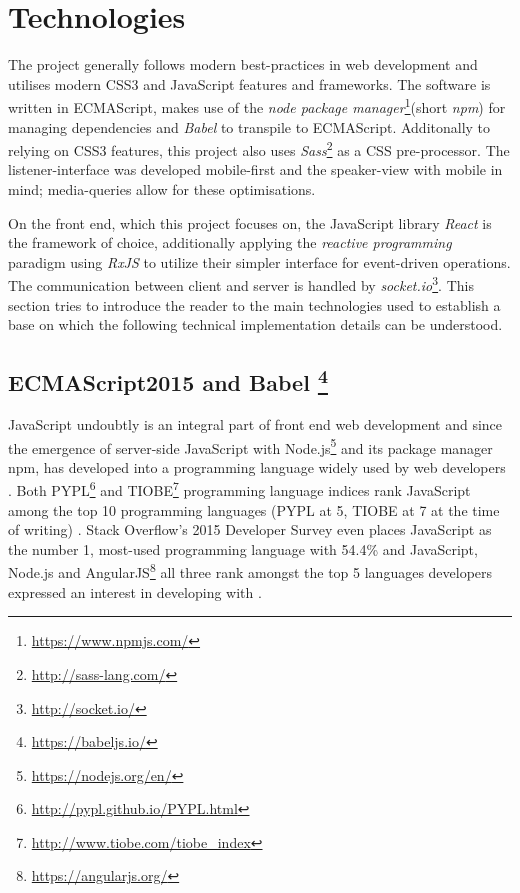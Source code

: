 \section{Technologies}
\label{sec:implementation-technologies}

The project generally follows modern best-practices in web development and utilises modern CSS3 and JavaScript features and frameworks. The software is written in ECMA\-Script, makes use of the \emph{node package manager}\footnote{\url{https://www.npmjs.com/}}(short \emph{npm}) for managing dependencies and \emph{Babel} to transpile to ECMA\-Script. Additonally to relying on CSS3 features, this project also uses \emph{Sass}\footnote{\url{http://sass-lang.com/}} as a CSS pre-processor. The listener-interface was developed mobile-first and the speaker-view with mobile in mind; media-queries allow for these optimisations.

On the front end, which this project focuses on, the JavaScript library \emph{React} is the framework of choice, additionally applying the \emph{reactive programming} paradigm using \emph{RxJS} to utilize their simpler interface for event-driven operations. The communication between client and server is handled by \emph{socket.io}\footnote{\url{http://socket.io/}}.
This section tries to introduce the reader to the main technologies used to establish a base on which the following technical implementation details can be understood.

\subsection[ECMAScript2015 and Babel]%
             {ECMAScript2015 and Babel%
             \protect\footnote{\url{https://babeljs.io/}}}%
\label{sec:implementation-technologies-es6}
JavaScript undoubtly is an integral part of front end web development and since the emergence of server-side JavaScript with Node.js\footnote{\url{https://nodejs.org/en/}} and its package manager npm, has developed into a programming language widely used by web developers \cite{gpm-meta-transcompiler}. Both PYPL\footnote{\url{http://pypl.github.io/PYPL.html}} and TIOBE\footnote{\url{http://www.tiobe.com/tiobe_index}} programming language indices rank JavaScript among the top 10 programming languages (PYPL at 5, TIOBE at 7 at the time of writing) \cite{gpm-meta-transcompiler}. Stack Overflow's 2015 Developer Survey even places JavaScript as the number 1, most-used programming language with 54.4\% and JavaScript, Node.js and AngularJS\footnote{\url{https://angularjs.org/}} all three rank amongst the top 5 languages developers expressed an interest in developing with \cite{stackoverflow-developer-survey}.

